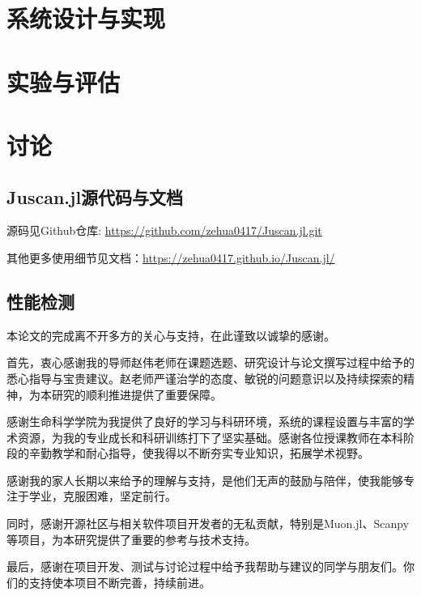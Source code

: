 \documentclass[AutoFakeBold]{LZUThesis}
\begin{document}
\chapter{系统设计与实现}


\chapter{实验与评估}


\chapter{讨论}


\backmatter


\printbib
\nocite{*} %

\Appendix

\section{Juscan.jl源代码与文档}

源码见Github仓库: \href{https://github.com/zehua0417/Juscan.jl.git}{https://github.com/zehua0417/Juscan.jl.git}

其他更多使用细节见文档：\href{https://zehua0417.github.io/Juscan.jl/}{https://zehua0417.github.io/Juscan.jl/}

\section{性能检测}


\Thanks

本论文的完成离不开多方的关心与支持，在此谨致以诚挚的感谢。

首先，衷心感谢我的导师赵伟老师在课题选题、研究设计与论文撰写过程中给予的悉心指导与宝贵建议。赵老师严谨治学的态度、敏锐的问题意识以及持续探索的精神，为本研究的顺利推进提供了重要保障。

感谢生命科学学院为我提供了良好的学习与科研环境，系统的课程设置与丰富的学术资源，为我的专业成长和科研训练打下了坚实基础。感谢各位授课教师在本科阶段的辛勤教学和耐心指导，使我得以不断夯实专业知识，拓展学术视野。

感谢我的家人长期以来给予的理解与支持，是他们无声的鼓励与陪伴，使我能够专注于学业，克服困难，坚定前行。

同时，感谢开源社区与相关软件项目开发者的无私贡献，特别是Muon.jl、Scanpy等项目，为本研究提供了重要的参考与技术支持。

最后，感谢在项目开发、测试与讨论过程中给予我帮助与建议的同学与朋友们。你们的支持使本项目不断完善，持续前进。

\Grade
\end{document}
